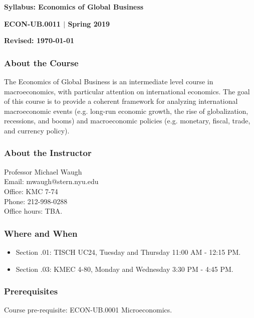 \documentclass[12pt,pdftex,twoside,letterpaper]{exam}
\begin{document}
\centerline{\Large\bf Syllabus:  Economics of Global Business}
\vspace{1mm}
\centerline{\large\bf ECON-UB.0011 $|$ Spring 2019}
\vspace{3mm}
\centerline{\bf Revised:  \today}

\vspace{-.25cm}

\subsubsection*{About the Course}

The Economics of Global Business is an intermediate level course in macroeconomics, with particular attention on international economics. The goal of this course is to provide a coherent framework for analyzing international macroeconomic events (e.g. long-run economic growth, the rise of globalization, recessions, and booms) and macroeconomic policies (e.g. monetary, fiscal, trade, and currency policy).

\subsubsection*{About the Instructor}
Professor Michael Waugh\\
Email: mwaugh@stern.nyu.edu\\
Office: KMC 7-74\\
Phone: 212-998-0288\\
Office hours: TBA.

\subsubsection*{Where and When}
\begin{itemize}
\item Section .01: TISCH UC24, Tuesday and Thursday 11:00 AM - 12:15 PM.
\item Section .03: KMEC 4-80, Monday and Wednesday 3:30 PM - 4:45 PM.
\end{itemize}

\subsubsection*{Prerequisites}

Course pre-requisite: ECON-UB.0001 Microeconomics.
\end{document}
